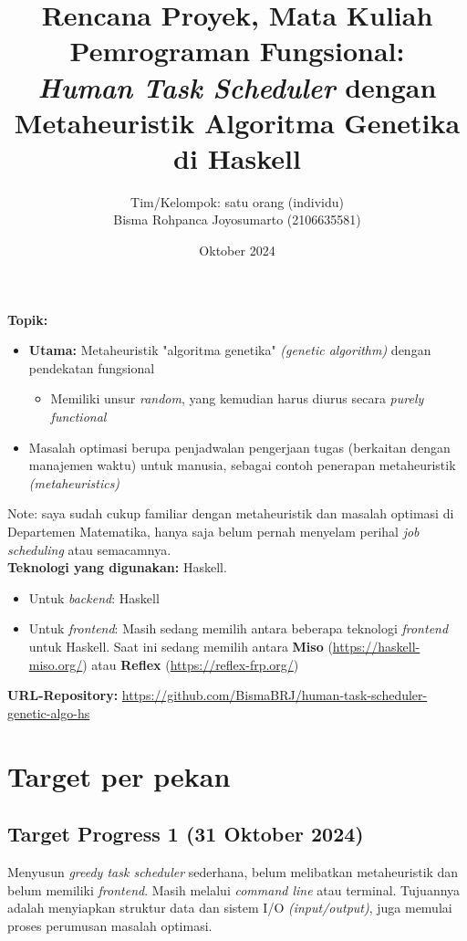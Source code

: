 \documentclass{article}
\title{Rencana Proyek, Mata Kuliah Pemrograman Fungsional: \\
\textit{Human Task Scheduler} dengan Metaheuristik Algoritma Genetika di Haskell}
\author{Tim/Kelompok: satu orang (individu) \\
Bisma Rohpanca Joyosumarto (2106635581)}
\date{Oktober 2024}
\begin{document}
\maketitle

\textbf{Topik:}
\begin{itemize}
    \item \textbf{Utama:} Metaheuristik "algoritma genetika" \textit{(genetic algorithm)} dengan pendekatan fungsional
    \begin{itemize}
        \item Memiliki unsur \textit{random}, yang kemudian harus diurus secara \textit{purely functional}
    \end{itemize}
    \item Masalah optimasi berupa penjadwalan pengerjaan tugas (berkaitan dengan manajemen waktu) untuk manusia, sebagai contoh penerapan metaheuristik \textit{(metaheuristics)}
\end{itemize}

Note: saya sudah cukup familiar dengan metaheuristik dan masalah optimasi di Departemen Matematika, hanya saja belum pernah menyelam perihal \textit{job scheduling} atau semacamnya. \\

\textbf{Teknologi yang digunakan:} Haskell.

\begin{itemize}
    \item Untuk \textit{backend}: Haskell
    \item Untuk \textit{frontend}: Masih sedang memilih antara beberapa teknologi \textit{frontend} untuk Haskell. Saat ini sedang memilih antara \textbf{Miso} (\url{https://haskell-miso.org/}) atau \textbf{Reflex} (\url{https://reflex-frp.org/})
\end{itemize}

\textbf{URL-Repository:} \url{https://github.com/BismaBRJ/human-task-scheduler-genetic-algo-hs}

\section*{Target per pekan}

\subsection*{Target Progress 1 (31 Oktober 2024)}

Menyusun \textit{greedy task scheduler} sederhana, belum melibatkan metaheuristik dan belum memiliki \textit{frontend}. Masih melalui \textit{command line} atau terminal. Tujuannya adalah menyiapkan struktur data dan sistem I/O \textit{(input/output)}, juga memulai proses perumusan masalah optimasi.
\end{document}
